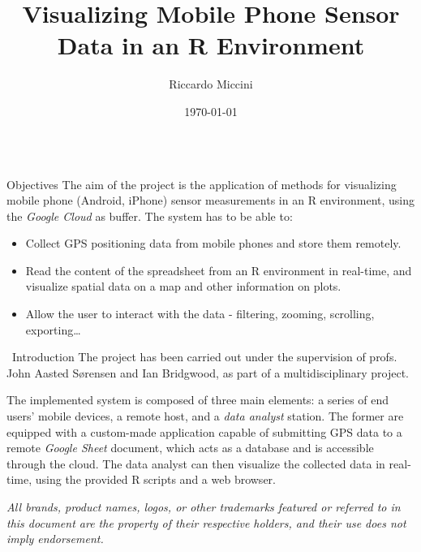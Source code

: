 \documentclass[final]{beamer}
\title{Visualizing Mobile Phone Sensor Data in an R Environment}
\author{Riccardo Miccini}
\institute{Technical University of Denmark - DTU}
\date{\today}
\newlength{\onecolwid}
\begin{document}
\begin{frame}[t]
\begin{columns}[t]

\begin{column}{\onecolwid}
	\begin{alertblock}{Objectives}
		The aim of the project is the application of methods for visualizing mobile phone (Android, iPhone) sensor measurements in an R environment, using the \emph{Google Cloud} as buffer.
		The system has to be able to:
		\begin{itemize}
			\item Collect GPS positioning data from mobile phones and store them remotely.
			\item Read the content of the spreadsheet from an R environment in real-time, and visualize spatial data on a map and other information on plots.
			\item Allow the user to interact with the data - filtering, zooming, scrolling, exporting\dots
		\end{itemize}
	\end{alertblock}

	\begin{block}{\faCommenting \, Introduction}
		The project has been carried out under the supervision of profs. John Aasted S{\o}rensen and Ian Bridgwood, as part of a multidisciplinary project.

		The implemented system is composed of three main elements: a series of end users' mobile devices, a remote host, and a \emph{data analyst} station.
		The former are equipped with a custom-made application capable of submitting GPS data to a remote \emph{Google Sheet} document, which acts as a database and is accessible through the cloud.
		The data analyst can then visualize the collected data in real-time, using the provided R scripts and a web browser.

		\bigskip

		\emph{All brands, product names, logos, or other trademarks featured or referred to in this document are the property of their respective holders, and their use does not imply endorsement.}
	\end{block}


\end{column}
\end{columns}
\end{frame}
\end{document}
